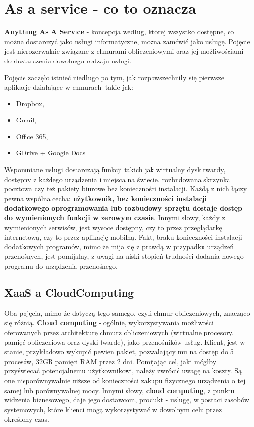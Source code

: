 \section{As a service - co to oznacza}
\label{chapter:monitoring_architecture:xaas}

\textbf{Anything As A Service} - koncepcja według, której wszystko dostępne, co można dostarczyć
jako usługi informatyczne, można zamówić jako usługę. Pojęcie jest nierozerwalnie związane z chmurami
obliczeniowymi oraz jej możliwościami do dostarczenia dowolnego rodzaju usługi.

Pojęcie zaczęło istnieć niedługo po tym, jak rozpowszechniły się pierwsze aplikacje działające w chmurach, takie jak:
\begin{itemize}
    \item Dropbox,
    \item Gmail,
    \item Office 365,
    \item GDrive + Google Docs
   \end{itemize}
Wspomniane usługi dostarczają funkcji takich jak wirtualny dysk twardy, dostępny z każdego urządzenia i miejsca na świecie,
rozbudowana skrzynka pocztowa czy też pakiety biurowe bez konieczności instalacji.
Każdą z nich łączy pewna wspólna cecha: \textbf{użytkownik, bez konieczności instalacji dodatkowego oprogramowania lub rozbudowy sprzętu dostaje dostęp do wymienionych funkcji w zerowym czasie}. Innymi słowy, każdy z wymienionych serwisów,
jest wysoce dostępny, czy to przez przeglądarkę internetową, czy to przez aplikację mobilną. Fakt, braku konieczności instalacji dodatkowych programów, mimo że mija się z prawdą w przypadku urządzeń przenośnych, jest pomijalny, z uwagi na niski stopień
trudności dodania nowego programu do urządzenia przenośnego. 

\subsection{XaaS a CloudComputing}
Oba pojęcia, mimo że dotyczą tego samego, czyli chmur obliczeniowych, znacząco się różnią. \textbf{Cloud computing} - ogólnie, wykorzystywania możliwości
oferowanych przez architekturę chmurz obliczeniowych (wirtualne procesory, pamięć obliczeniowa oraz dyski twarde), jako przenośników usług. Klient, jest w stanie, przykładowo wykupić pewien pakiet, pozwalający mu na dostęp do 5 procesów, 32GB pamięci RAM przez 2 dni. Pomijając cel, jaki mógłby przyświecać potencjalnemu użytkownikowi, należy zwrócić uwagę na koszty. Są one nieporównywalnie niższe od konieczności zakupu fizycznego urządzenia
o tej samej lub porównywalnej mocy. Innymi słowy, \textbf{cloud computing}, z punktu widzenia biznesowego, daje jego dostawcom, produkt - usługę, w postaci zasobów systemowych, które klienci mogą wykorzystywać w dowolnym celu przez określony czas.

